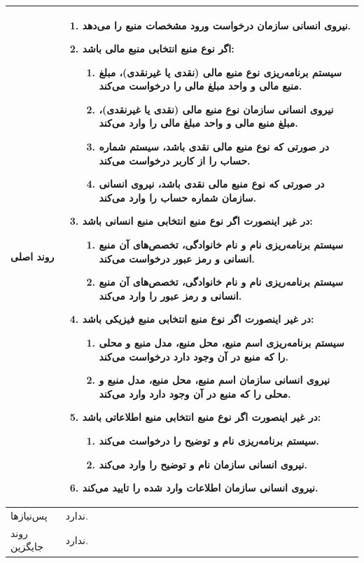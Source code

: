\begin{table}[H]
\begin{tabular}{|p{3cm}|p{11cm}|}
		
		روند اصلی &
		\begin{enumerate}[topsep=0cm,leftmargin=0.5cm]
			\item نیروی انسانی سازمان درخواست ورود مشخصات منبع را می‌دهد.
			\item اگر نوع منبع انتخابی منبع مالی باشد:
			\begin{enumerate}[topsep=0cm,leftmargin=0.5cm]
				\item سیستم برنامه‌ریزی نوع منبع مالی (نقدی یا غیرنقدی)، مبلغ منبع مالی و واحد مبلغ مالی را درخواست می‌کند.
				\item نیروی انسانی سازمان نوع منبع مالی (نقدی یا غیرنقدی)، مبلغ منبع مالی و واحد مبلغ مالی را وارد می‌کند.
				\item در صورتی که نوع منبع مالی نقدی باشد، سیستم شماره حساب را از کاربر درخواست می‌کند.
				\item در صورتی که نوع منبع مالی نقدی باشد، نیروی انسانی سازمان شماره حساب را وارد می‌کند.
			\end{enumerate}
			\item در غیر اینصورت اگر نوع منبع انتخابی منبع انسانی باشد:
			\begin{enumerate}[topsep=0cm,leftmargin=0.5cm]
				\item سیستم برنامه‌ریزی نام و نام خانوادگی، تخصص‌های آن منبع  انسانی و رمز عبور  درخواست می‌کند.
				\item سیستم برنامه‌ریزی نام و نام خانوادگی، تخصص‌های آن منبع انسانی و رمز عبور را وارد می‌کند.
			\end{enumerate}
			\item در غیر اینصورت اگر نوع منبع انتخابی منبع فیزیکی باشد:
			\begin{enumerate}[topsep=0cm,leftmargin=0.5cm]
				\item  سیستم برنامه‌ریزی اسم منبع، محل منبع، مدل منبع و محلی را که منبع در آن وجود دارد درخواست می‌کند.
				\item نیروی انسانی سازمان اسم منبع، محل منبع، مدل منبع و محلی را که منبع در آن وجود دارد وارد می‌کند.
			\end{enumerate}
			\item در غیر اینصورت اگر نوع منبع انتخابی منبع اطلاعاتی باشد:
			\begin{enumerate}[topsep=0cm,leftmargin=0.5cm]
				\item سیستم برنامه‌ریزی نام و توضیح را درخواست می‌کند.
				\item نیروی انسانی سازمان نام و توضیح را وارد می‌کند.
			\end{enumerate}
			\item نیروی انسانی سازمان اطلاعات وارد شده را تایید می‌کند.
		\end{enumerate} \\
		\hline
		
		پس‌نیازها &
		ندارد. \\
		
		\hline
		روند جایگزین
		& ندارد. \\
		\hline
		
	\end{tabular}
\end{table}

